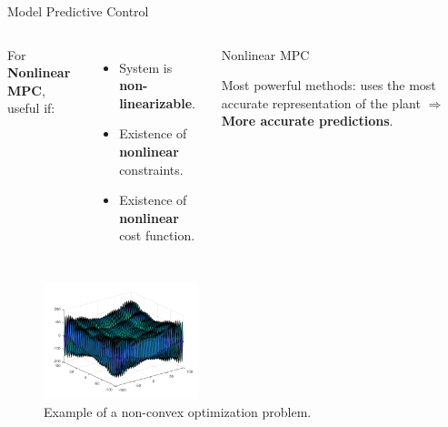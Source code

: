 \documentclass{thesisbeamer}
\begin{document}
\begin{frame}[t]{Model Predictive Control} \vspace{4pt}

\begin{columns}


For \textbf{Nonlinear MPC}, useful if:
\begin{itemize}
	\item System is \textbf{non-linearizable}.
	\item Existence of \textbf{nonlinear} constraints.
	\item Existence of \textbf{nonlinear} cost function.
\end{itemize}


\begin{block}{Nonlinear MPC}

\vspace{0.5em}
Most powerful methods: uses the most accurate representation of the plant $\Rightarrow$ \textbf{More accurate predictions}.
\vspace{0.5em}

\end{block}
\end{columns}


\begin{figure}
	\centering	\includegraphics[width=0.4\textwidth]{Images/Control/MPC_Nonconvex_Equation_b}
	\caption{Example of a non-convex optimization problem.}
\end{figure}


\end{frame}



\end{document}
